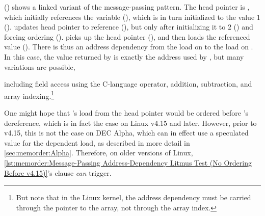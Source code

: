 \begin{listing}[tbp]

\caption{Message-Passing Address-Dependency Litmus Test (No Ordering Before v4.15)}
\label{lst:memorder:Message-Passing Address-Dependency Litmus Test (No Ordering Before v4.15)}
\end{listing}

\begin{fcvref}
()
shows a linked variant of the message-passing pattern.
The head pointer is , which initially
references the  variable  (), which is in turn
initialized to the value $1$ ().
 updates head pointer  to reference  (),
but only after initializing it to $2$ () and forcing ordering
().
 picks up the head pointer  (), and then loads
the referenced value ().
There is thus an address dependency from the load on  to the
load on .
In this case, the value returned by  is exactly the address
used by , but many variations are possible,
\end{fcvref}
including field access using the C-language \co{->} operator,
addition, subtraction, and array indexing.\footnote{
	But note that in the Linux kernel, the address dependency must
	be carried through the pointer to the array, not through the
	array index.}

\begin{fcvref}
One might hope that 's load from the head pointer would be ordered
before 's dereference, which is in fact the case on Linux v4.15
and later.
However, prior to v4.15, this is not the case on DEC Alpha, which can
in effect use a speculated value for the dependent load, as described
in more detail in \cref{sec:memorder:Alpha}.
Therefore, on older versions of Linux,
\cref{lst:memorder:Message-Passing Address-Dependency Litmus Test (No Ordering Before v4.15)}'s
 clause \emph{can} trigger.
\end{fcvref}

